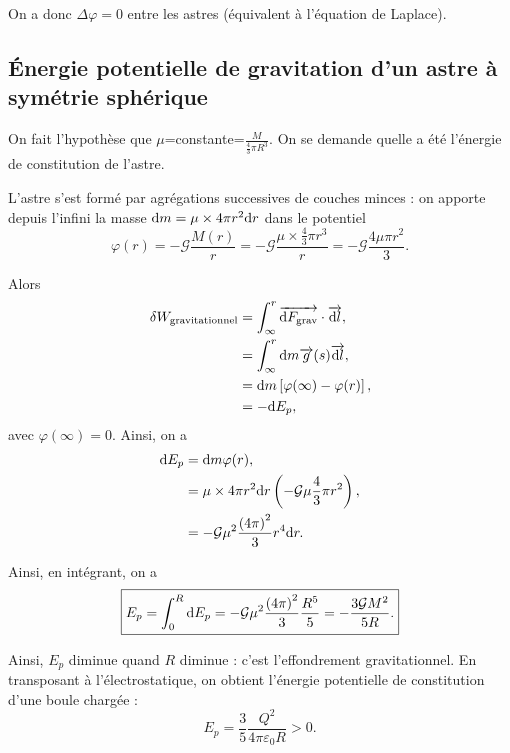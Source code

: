     On a donc $\Delta \varphi=0$ entre les astres (équivalent à l'équation de Laplace).

    \subsection{Énergie potentielle de gravitation d'un astre à symétrie sphérique}

        On fait l'hypothèse que $\mu$=constante=$\frac{M}{\frac{4}{3}\pi R^{3}}$. On se demande quelle a été l'énergie de constitution de l'astre.

        L'astre s'est formé par agrégations successives de couches minces : on apporte depuis l'infini la masse $\mathrm{d} m=\mu\times 4\pi r^{2}\mathrm{d} r$ dans le potentiel 
        \begin{equation}
            \varphi(r)=-\mathcal{G}\frac{M(r)}{r}=-\mathcal{G}\frac{\mu\times\frac{4}{3}\pi r^{3}}{r}=-\mathcal{G}\frac{4\mu\pi r^{2}}{3}.
        \end{equation}

        Alors 
        \begin{align}
            \delta W_{\text{gravitationnel}}
            &=\int_{\infty}^{r}\protect\overrightarrow{{\mathrm{d} F_{\text{grav}}}}\cdot\protect\overrightarrow{{\mathrm{d} l}},\\
            &=\int_{\infty}^{r}\mathrm{d} m\protect\overrightarrow{{g}}(s)\protect\overrightarrow{{\mathrm{d} l}},\\
            &=
            \mathrm{d} m\left[
                \varphi(\infty)-\varphi(r)
            \right],\\
            &=
            -\mathrm{d} E_p,
        \end{align}
        avec $\varphi(\infty)=0$. Ainsi, on a 
        \begin{align}
            \mathrm{d} E_p
            &=
            \mathrm{d} m\varphi(r),\\
            &=
            \mu\times 4\pi r^{2}\mathrm{d} r\left(-\mathcal{G}\mu\frac{4}{3}\pi r^{2}\right),\\
            &=
            -\mathcal{G}\mu^{2}\frac{\left(4\pi\right)^{2}}{3}r^{4}\mathrm{d} r.
        \end{align}

        Ainsi, en intégrant, on a 
        \begin{equation}
            \boxed{
                E_p=\int_{0}^{R}\mathrm{d} E_p=-\mathcal{G}\mu^{2}\frac{\left(4\pi\right)^{2}}{3}\frac{R^{5}}{5}=-\frac{3\mathcal{G}M^{2}}{5R}.
            }
        \end{equation}

        Ainsi, $E_p$ diminue quand $R$ diminue : c'est l'effondrement gravitationnel. En transposant à l'électrostatique, on obtient l'énergie potentielle de constitution d'une boule chargée :
        \begin{equation}
            \boxed{
                E_p=\frac{3}{5}\frac{Q^{2}}{4\pi\varepsilon_0 R}>0.
            }
        \end{equation}